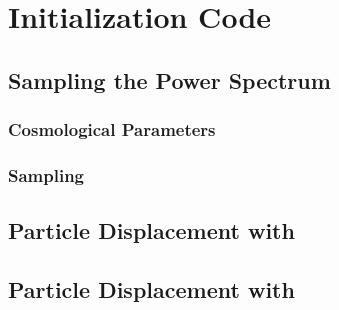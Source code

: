 
%
%

\section{Initialization Code}
\label{sec:initialization_code}





\subsection{Sampling the Power Spectrum}
\label{subsec:sampling}



\subsubsection{Cosmological Parameters}
\label{subsubsec:cosmological_parameters}



\subsubsection{Sampling}
\label{subsubsec:sampling}




\subsection{Particle Displacement with \za}
\label{subsec:za_displacement}




\subsection{Particle Displacement with \lpt}
\label{subsec:2lpt_displacement}




